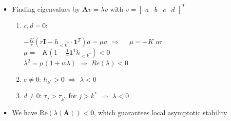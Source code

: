 \documentclass[10pt]{beamer}
\begin{document}
\begin{frame}

\begin{itemize}

\item Finding eigenvalues by $ \bm{A} v = \lambda v$ with $v =  \begin{bmatrix} a & b & c & d \end{bmatrix}^T $

\begin{enumerate}

\item $c, d = 0$:

$  -\frac{K}{r} (r \bm{I} - h_{< k^*} \cdot \bm{1}^T) a = \mu a$  $ \Rightarrow$ $ \quad \mu = -K$ or $\mu = -K  (1 - \frac{1}{r}\bm{1}^T h_{< k^*}) < 0 $
\\
$\lambda^2 = \mu (1 + w \lambda)$ $\Rightarrow$ $Re(\lambda) < 0$

\item $c \neq 0$: $h_{k^*} > 0 $ $\Rightarrow $ $\lambda < 0$

\item $d \neq 0$: $\tau_j > \tau_{k^*}$ for $j > k^*$ $\Rightarrow $ $\lambda < 0$


\end{enumerate}



\item We have $\mathrm{Re}( \lambda(\bm{A}) ) < 0$, which guarantees local asymptotic stability


\end{itemize}

\end{frame}
\end{document}
